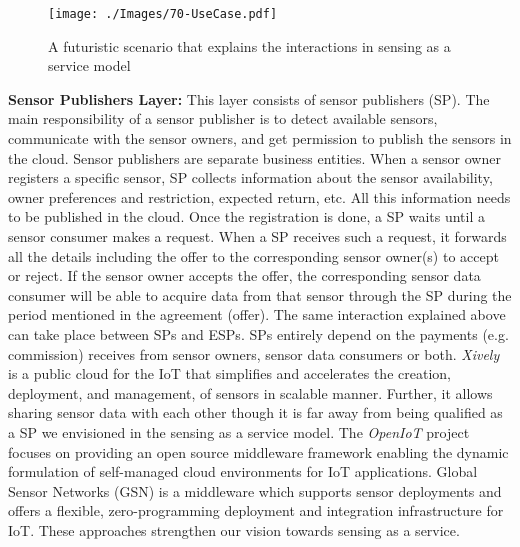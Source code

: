 \documentclass[times]{ettauth}
\begin{document}
\begin{figure*}[t]
 \centering
\texttt{[image: ./Images/70-UseCase.pdf]}
\caption{A futuristic scenario that explains the interactions in sensing as a service model}
 \label{Figure:UseCase}	
\vspace{-0.18cm}	
\end{figure*}

\textbf{Sensor Publishers Layer:} This layer consists of sensor publishers (SP). The main responsibility of a sensor publisher is to detect available sensors, communicate with the sensor owners, and get  permission to publish the sensors in the cloud. Sensor publishers are separate business entities. When a sensor owner registers a specific sensor, SP collects information about the sensor availability, owner preferences and restriction, expected return, etc. All this information needs to be published in the cloud. Once the registration is done, a SP waits until a sensor consumer makes a request. When a SP receives such a request, it forwards all the details including the offer to the corresponding sensor owner(s) to accept or reject. If the sensor owner accepts the offer, the corresponding sensor data consumer will be able to acquire  data from that sensor through the SP during the period mentioned in the agreement (offer). The same interaction explained above can take place between SPs and ESPs. SPs entirely depend on the payments (e.g. commission) receives from sensor owners, sensor data consumers or both. \textit{Xively} \cite{P579} is a public cloud for the IoT that simplifies and accelerates the creation, deployment, and management, of sensors in scalable manner. Further, it allows sharing sensor data with each other though it is far away from being qualified as a SP  we envisioned in the sensing as a service model. The \textit{OpenIoT} project \cite{P377}  focuses on providing an open source middleware framework enabling the dynamic formulation of self-managed cloud environments for IoT applications. Global Sensor Networks (GSN) \cite{P227} is a middleware which supports sensor deployments and offers a flexible, zero-programming deployment and integration infrastructure for IoT. These approaches strengthen our vision towards sensing as a service.
\end{document}
